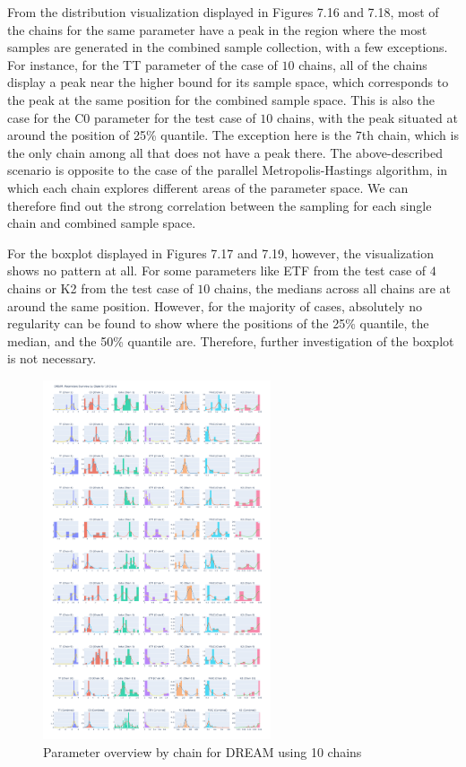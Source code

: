 From the distribution visualization displayed in Figures 7.16 and 7.18, most of the chains for the same parameter have a peak in the region where the most samples are generated in the combined sample collection, with a few exceptions. For instance, for the TT parameter of the case of $10$ chains, all of the chains display a peak near the higher bound for its sample space, which corresponds to the peak at the same position for the combined sample space. This is also the case for the C0 parameter for the test case of $10$ chains, with the peak situated at around the position of 25\% quantile. The exception here is the $7$th chain, which is the only chain among all that does not have a peak there. The above-described scenario is opposite to the case of the parallel Metropolis-Hastings algorithm, in which each chain explores different areas of the parameter space. We can therefore find out the strong correlation between the sampling for each single chain and combined sample space.

For the boxplot displayed in Figures 7.17 and 7.19, however, the visualization shows no pattern at all. For some parameters like ETF from the test case of $4$ chains or K2 from the test case of $10$ chains, the medians across all chains are at around the same position. However, for the majority of cases, absolutely no regularity can be found to show where the positions of the 25\% quantile, the median, and the 50\% quantile are. Therefore, further investigation of the boxplot is not necessary.

\begin{figure}[H]
    \centering
    \includegraphics[width=0.6\textwidth]{figures/dream/param_overview_10.png}
    \captionsetup{width=.8\textwidth}
    \caption{Parameter overview by chain for DREAM using 10 chains}
    \label{fig:enter-label}
\end{figure}

